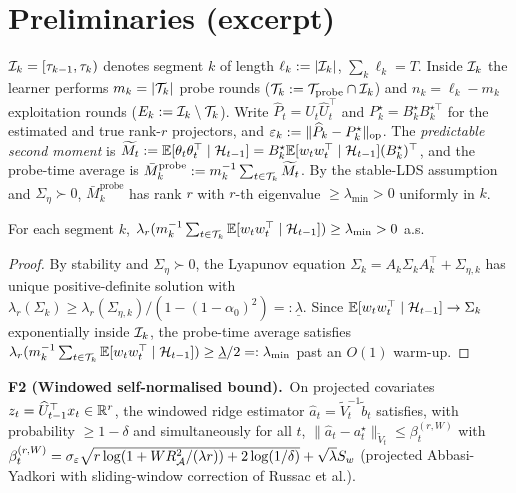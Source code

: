 \section*{Preliminaries (excerpt)}

$\mathcal{I}_k = [\tau_{k-1}, \tau_k)$ denotes segment $k$ of length
$\ell_k := |\mathcal{I}_k|$, $\sum_k \ell_k = T$. Inside $\mathcal{I}_k$ the learner
performs $m_k = |\mathcal{T}_k|$ probe rounds ($\mathcal{T}_k := \mathcal{T}_{\mathrm{probe}}\cap\mathcal{I}_k$)
and $n_k = \ell_k - m_k$ exploitation rounds ($E_k := \mathcal{I}_k\setminus\mathcal{T}_k$).
Write $\widehat P_t = \widehat U_t \widehat U_t^\top$ and
$P_k^\star = B_k^\star B_k^{\star\top}$ for the estimated and true rank-$r$
projectors, and $\varepsilon_k := \|\widehat P_k - P_k^\star\|_{\mathrm{op}}$.
The \emph{predictable second moment} is
$\widetilde M_t := \mathbb{E}[\theta_t\theta_t^\top\mid\mathcal{H}_{t-1}]
= B_k^\star \mathbb{E}[w_tw_t^\top\mid\mathcal{H}_{t-1}](B_k^\star)^\top$, and the
probe-time average is
$\bar M_k^{\mathrm{probe}} := m_k^{-1}\sum_{t\in\mathcal{T}_k}\widetilde M_t$.
By the stable-LDS assumption and $\Sigma_\eta\succ 0$,
$\bar M_k^{\mathrm{probe}}$ has rank $r$ with $r$-th eigenvalue
$\ge\lambda_{\min}>0$ uniformly in $k$.

\begin{lemma}
\label{lem:probe_excitation_conf}
For each segment $k$,
$\lambda_r(m_k^{-1}\sum_{t\in\mathcal{T}_k}\mathbb{E}[w_tw_t^\top\mid\mathcal{H}_{t-1}])
\ge \lambda_{\min}>0$ a.s.
\end{lemma}
\begin{proof}
By stability and $\Sigma_\eta\succ 0$, the Lyapunov equation
$\Sigma_k = A_k\Sigma_k A_k^\top + \Sigma_{\eta,k}$ has unique
positive-definite solution with $\lambda_r(\Sigma_k)\ge
\lambda_r(\Sigma_{\eta,k})/(1-(1-\alpha_0)^2)=:\underline\lambda$.
Since $\mathbb{E}[w_tw_t^\top\mid\mathcal{H}_{t-1}]\to\Sigma_k$ exponentially inside
$\mathcal{I}_k$, the probe-time average satisfies
$\lambda_r(m_k^{-1}\sum_{t\in\mathcal{T}_k}\mathbb{E}[w_tw_t^\top\mid\mathcal{H}_{t-1}])\ge\underline\lambda/2=:\lambda_{\min}$
past an $O(1)$ warm-up.
\end{proof}

\noindent\textbf{F2 (Windowed self-normalised bound).}\ On projected
covariates $z_t = \widehat U_{t-1}^\top x_t\in\mathbb{R}^r$, the windowed ridge
estimator $\widehat a_t = \widetilde V_t^{-1}\widetilde b_t$ satisfies,
with probability $\ge 1-\delta$ and simultaneously for all $t$,
$\|\widehat a_t - a_t^\star\|_{\widetilde V_t}\le\beta^{(r,W)}_t$
with $\beta^{(r,W)}_t = \sigma_\varepsilon\sqrt{r\log(1+WR_{\mathcal{A}}^2/(\lambda r)) + 2\log(1/\delta)} + \sqrt\lambda S_w$
(projected Abbasi-Yadkori with sliding-window correction of Russac et al.).

